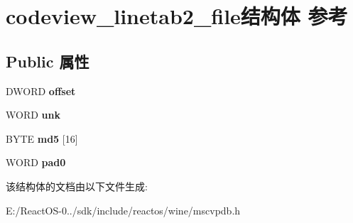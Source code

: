 \hypertarget{structcodeview__linetab2__file}{}\section{codeview\+\_\+linetab2\+\_\+file结构体 参考}
\label{structcodeview__linetab2__file}
\subsection*{Public 属性}
\begin{DoxyCompactItemize}
\item 
\mbox{\label{structcodeview__linetab2__file_ab39ab02936280231ff1f4941b56c8f16}} 
D\+W\+O\+RD {\bfseries offset}
\item 
\mbox{\label{structcodeview__linetab2__file_adf9ca4c18c4667f58a312633b633061a}} 
W\+O\+RD {\bfseries unk}
\item 
\mbox{\label{structcodeview__linetab2__file_a4465f16826327c610ae307a2a75a06c7}} 
B\+Y\+TE {\bfseries md5} \mbox{[}16\mbox{]}
\item 
\mbox{\label{structcodeview__linetab2__file_ad2b9d9e9a22f56851386701c64857ac3}} 
W\+O\+RD {\bfseries pad0}
\end{DoxyCompactItemize}


该结构体的文档由以下文件生成\+:\begin{DoxyCompactItemize}
\item 
E\+:/\+React\+O\+S-\/0../sdk/include/reactos/wine/mscvpdb.\+h\end{DoxyCompactItemize}
